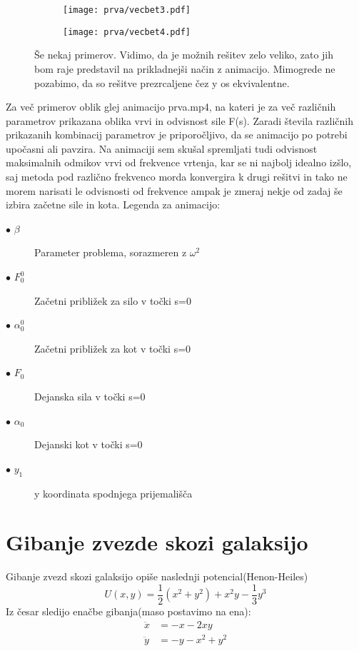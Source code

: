 \documentclass{article}
\begin{document}
\begin{figure}[H]
\centering
\begin{subfigure}{.49\textwidth}
\texttt{[image: prva/vecbet3.pdf]}
\end{subfigure}
\begin{subfigure}{.49\textwidth}
\texttt{[image: prva/vecbet4.pdf]}
\end{subfigure}
\caption*{Še nekaj primerov. Vidimo, da je možnih rešitev zelo veliko, zato jih bom raje predstavil na prikladnejši način z animacijo. Mimogrede ne pozabimo, da so rešitve prezrcaljene čez y os ekvivalentne.}
\end{figure}


Za več primerov oblik glej animacijo prva.mp4, na kateri je za več različnih parametrov prikazana oblika vrvi in odvisnost sile F(s). Zaradi števila različnih prikazanih kombinacij parametrov je priporočljivo, da se animacijo po potrebi upočasni ali pavzira.
Na animaciji sem skušal spremljati tudi odvisnost maksimalnih odmikov vrvi od frekvence vrtenja, kar se ni najbolj idealno izšlo, saj metoda pod različno frekvenco morda konvergira k drugi rešitvi in tako ne morem narisati le odvisnosti od frekvence ampak je zmeraj nekje od zadaj še izbira začetne sile in kota.
Legenda za animacijo:
\begin{description}
  \item[$\bullet$ $\beta$] Parameter problema, sorazmeren z $\omega^2$
  \item[$\bullet$ $F_0^0$] Začetni približek za silo v točki s=0
  \item[$\bullet$ $\alpha_0^0$] Začetni približek za kot v točki s=0
  \item[$\bullet$ $F_0$] Dejanska sila v točki s=0
  \item[$\bullet$ $\alpha_0$] Dejanski kot v točki s=0
  \item[$\bullet$ $y_1$] y koordinata spodnjega prijemališča
\end{description}
\newpage
\section{Gibanje zvezde skozi galaksijo}

Gibanje zvezd skozi galaksijo opiše naslednji potencial(Henon-Heiles)
\begin{equation*}
U(x,y) = \frac{1}{2}(x^2+y^2)+x^2 y - \frac{1}{3}y^3
\end{equation*}
Iz česar sledijo enačbe gibanja(maso postavimo na ena):
\begin{align*}
\ddot{x} &= -x - 2xy\\
\ddot{y} &= -y - x^2 +y^2
\end{align*}
\end{document}
